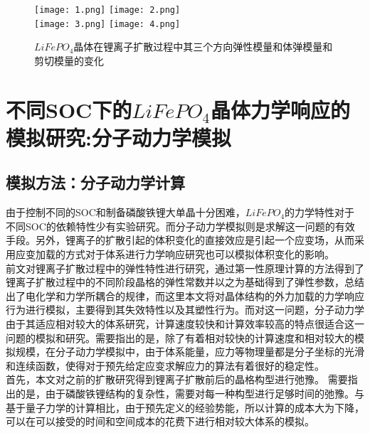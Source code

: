 \begin{figure}
  \centering
  \texttt{[image: 1.png]}\hfill
  \texttt{[image: 2.png]}\\[0.5mm]
  \texttt{[image: 3.png]}\hfill
  \texttt{[image: 4.png]}
  \caption{$LiFePO_4$晶体在锂离子扩散过程中其三个方向弹性模量和体弹模量和剪切模量的变化} 
	\label{fig:mat}
\end{figure}

\section{不同SOC下的$LiFePO_4$晶体力学响应的模拟研究:分子动力学模拟}
\subsection{模拟方法：分子动力学计算}
由于控制不同的SOC\cite{Qi2010Threefold}和制备磷酸铁锂大单晶十分困难，$LiFePO_4$的力学特性对于不同SOC的依赖特性少有实验研究。而分子动力学模拟则是求解这一问题的有效手段。另外，锂离子的扩散引起的体积变化的直接效应是引起一个应变场，从而采用应变加载的方式对于体系进行力学响应研究也可以模拟体积变化的影响。\\
\indent 前文对锂离子扩散过程中的弹性特性进行研究，通过第一性原理计算的方法得到了锂离子扩散过程中的不同阶段晶格的弹性常数并以之为基础得到了弹性参数，总结出了电化学和力学所耦合的规律，而这里本文将对晶体结构的外力加载的力学响应行为进行模拟，主要得到其失效特性以及其塑性行为。而对这一问题，分子动力学由于其适应相对较大的体系研究，计算速度较快和计算效率较高的特点很适合这一问题的模拟和研究。需要指出的是，除了有着相对较快的计算速度和相对较大的模拟规模，在分子动力学模拟中，由于体系能量，应力等物理量都是分子坐标的光滑和连续函数，使得对于预先给定应变求解应力的算法有着很好的稳定性。\\
\indent  首先，本文对之前的扩散研究得到锂离子扩散前后的晶格构型进行弛豫。 需要指出的是，由于磷酸铁锂结构的复杂性，需要对每一种构型进行足够时间的弛豫。与基于量子力学的计算相比，由于预先定义的经验势能，所以计算的成本大为下降，可以在可以接受的时间和空间成本的花费下进行相对较大体系的模拟。\\

